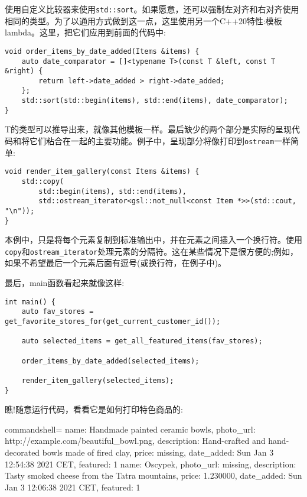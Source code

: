 使用自定义比较器来使用\texttt{std::sort}。如果愿意，还可以强制左对齐和右对齐使用相同的类型。为了以通用方式做到这一点，这里使用另一个C++20特性:模板lambda。这里，把它们应用到前面的代码中:

\begin{lstlisting}[style=styleCXX]
void order_items_by_date_added(Items &items) {
	auto date_comparator = []<typename T>(const T &left, const T &right) {
		return left->date_added > right->date_added;
	};
	std::sort(std::begin(items), std::end(items), date_comparator);
}
\end{lstlisting}

T的类型可以推导出来，就像其他模板一样。最后缺少的两个部分是实际的呈现代码和将它们粘合在一起的主要功能。例子中，呈现部分将像打印到\texttt{ostream}一样简单:

\begin{lstlisting}[style=styleCXX]
void render_item_gallery(const Items &items) {
	std::copy(
		std::begin(items), std::end(items),
		std::ostream_iterator<gsl::not_null<const Item *>>(std::cout, "\n"));
}
\end{lstlisting}

本例中，只是将每个元素复制到标准输出中，并在元素之间插入一个换行符。使用\texttt{copy}和\texttt{ostream\_iterator}处理元素的分隔符。这在某些情况下是很方便的;例如，如果不希望最后一个元素后面有逗号(或换行符，在例子中)。

最后，main函数看起来就像这样:

\begin{lstlisting}[style=styleCXX]
int main() {
	auto fav_stores = get_favorite_stores_for(get_current_customer_id());
	
	auto selected_items = get_all_featured_items(fav_stores);
	
	order_items_by_date_added(selected_items);
	
	render_item_gallery(selected_items);
}
\end{lstlisting}

瞧!随意运行代码，看看它是如何打印特色商品的:

\begin{tcblisting}{commandshell={}}
name: Handmade painted ceramic bowls, photo_url:
http://example.com/beautiful_bowl.png, description: Hand-crafted and hand-
decorated bowls made of fired clay, price: missing, date_added: Sun Jan 3
12:54:38 2021 CET, featured: 1
name: Oscypek, photo_url: missing, description: Tasty smoked cheese from
the Tatra mountains, price: 1.230000, date_added: Sun Jan 3 12:06:38 2021
CET, featured: 1
\end{tcblisting}

